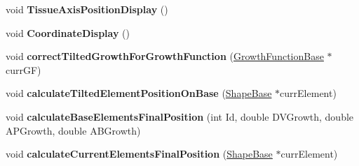 \begin{DoxyCompactItemize}
\item 
\hypertarget{classSimulation_abb87948e7b8131fd5d747bf728232db2}{}void {\bfseries Tissue\+Axis\+Position\+Display} ()\label{classSimulation_abb87948e7b8131fd5d747bf728232db2}

\item 
\hypertarget{classSimulation_a036abef711ca14c40aa838a1c2b0a4c9}{}void {\bfseries Coordinate\+Display} ()\label{classSimulation_a036abef711ca14c40aa838a1c2b0a4c9}

\item 
\hypertarget{classSimulation_a3b25df63c54a058e6917309aed483e6e}{}void {\bfseries correct\+Tilted\+Growth\+For\+Growth\+Function} (\hyperlink{classGrowthFunctionBase}{Growth\+Function\+Base} $\ast$curr\+G\+F)\label{classSimulation_a3b25df63c54a058e6917309aed483e6e}

\item 
\hypertarget{classSimulation_acbe2603b1eb8b50978f9f1d30f87311c}{}void {\bfseries calculate\+Tilted\+Element\+Position\+On\+Base} (\hyperlink{classShapeBase}{Shape\+Base} $\ast$curr\+Element)\label{classSimulation_acbe2603b1eb8b50978f9f1d30f87311c}

\item 
\hypertarget{classSimulation_aa6e3525243aaf17afe95dc5bd97a124a}{}void {\bfseries calculate\+Base\+Elements\+Final\+Position} (int Id, double D\+V\+Growth, double A\+P\+Growth, double A\+B\+Growth)\label{classSimulation_aa6e3525243aaf17afe95dc5bd97a124a}

\item 
\hypertarget{classSimulation_af6f6e9ee39d12e91957d934a2f1711f9}{}void {\bfseries calculate\+Current\+Elements\+Final\+Position} (\hyperlink{classShapeBase}{Shape\+Base} $\ast$curr\+Element)\label{classSimulation_af6f6e9ee39d12e91957d934a2f1711f9}

\end{DoxyCompactItemize}
